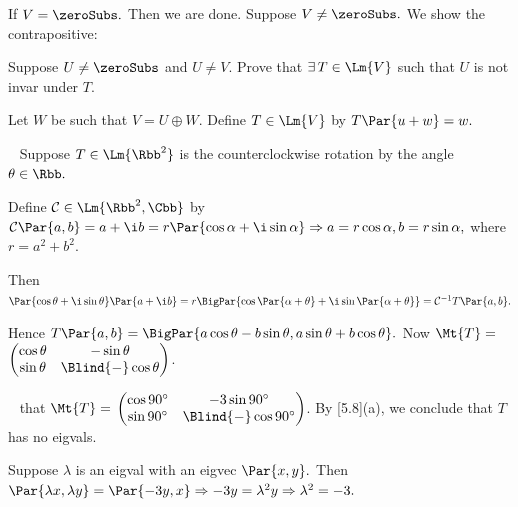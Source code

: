 \SepLine

If $V=\zeroSubs.$ Then we are done. Suppose $V\neq\zeroSubs.$ We show the contrapositive:\par
\Blind{\Solution} {\tgsl Suppose $U\neq\zeroSubs$ and $U\neq V.$ Prove that $\exists\,T\in\Lm{V}$ such that $U$ is not invar under $T$.}\par
\Blind{\Solution} Let $W$ be such that $V=U\oplus W.$ Define $T\in\Lm{V}$ by $T\Par{u+w}=w.$\PfEnd
\SepLine

\BulletPointX\Tips\,\,\, {Suppose $T\in\Lm{\Rbb^2}$ is the counterclockwise rotation by the angle $\theta\in\Rbb.$}\par\quad
{Define $\mathcal{C}\in\Lm{\Rbb^2,\Cbb}$ by $\mathcal{C}\Par{a,b}=a+\i b=r\Par{\cos\alpha+\i\sin\alpha}\Rightarrow a=r\cos\alpha,b=r\sin\alpha,$ where $r=a^2+b^2.$}\par\quad
{Then $\Par{\cos\theta+\i\sin\theta}\Par{a+\i b}=r\BigPar{\cos\Par{\alpha+\theta}+\i\sin\Par{\alpha+\theta}}=\mathcal{C}^{-1}T\Par{a,b}.$}\par\quad
{Hence $T\Par{a,b}=\BigPar{a\cos\theta-b\sin\theta,a\sin\theta+b\cos\theta}.$ Now $\Mt{T}=\;${\normalsize$\begin{pmatrix}
			\cos\theta & -\sin\theta\\
			\sin\theta & \Blind{-}\cos\theta
		\end{pmatrix}$}.}\vspace{6pt}\par\quad
\Example \,\,\,\OR{}\quad
\NOTICE that $\Mt{T}=\;${\normalsize$\begin{pmatrix}
		\cos90^\circ & -3\sin90^\circ\\
		\sin90^\circ & \Blind{-}\cos90^\circ
	\end{pmatrix}$}. By [5.8](a), we conclude that $T$ has no eigvals.\vspace{4pt}\par\quad
\Or Suppose $\lambda$ is an eigval with an eigvec $\Par{x,y}.$ Then $\Par{\lambda x,\lambda y}=\Par{-3y,x}\Rightarrow-3y=\lambda^2 y\Rightarrow \lambda^2=-3.$\par\quad
\Blind{\Or}\PfEnd
\SepLine

